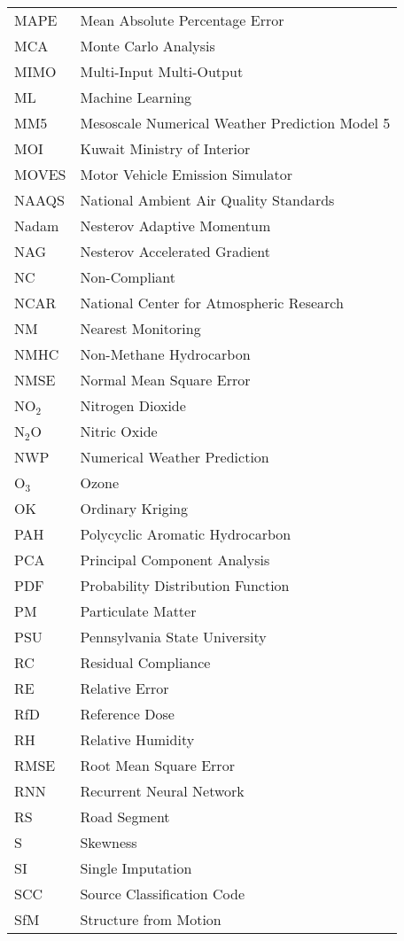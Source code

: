 \begin{longtable}{ll}
MAPE & Mean Absolute Percentage Error \\
MCA & Monte Carlo Analysis \\
MIMO & Multi-Input Multi-Output \\
ML & Machine Learning \\
MM5 & Mesoscale Numerical Weather Prediction Model 5 \\
MOI & Kuwait Ministry of Interior \\
MOVES & Motor Vehicle Emission Simulator \\
NAAQS & National Ambient Air Quality Standards \\
Nadam & Nesterov Adaptive Momentum \\
NAG & Nesterov Accelerated Gradient \\
NC & Non-Compliant \\
NCAR & National Center for Atmospheric Research \\
NM & Nearest Monitoring \\
NMHC & Non-Methane Hydrocarbon \\
NMSE & Normal Mean Square Error \\
NO$_{2}$ & Nitrogen Dioxide \\
N$_{2}$O & Nitric Oxide \\
NWP & Numerical Weather Prediction \\
O$_{3}$ & Ozone \\
OK & Ordinary Kriging \\
PAH & Polycyclic Aromatic Hydrocarbon \\
PCA & Principal Component Analysis \\
PDF & Probability Distribution Function \\
PM & Particulate Matter \\
PSU & Pennsylvania State University \\
RC & Residual Compliance \\
RE & Relative Error \\
RfD & Reference Dose \\
RH & Relative Humidity \\
RMSE & Root Mean Square Error \\
RNN & Recurrent Neural Network \\
RS & Road Segment \\
S & Skewness \\
SI & Single Imputation \\
SCC & Source Classification Code \\
SfM & Structure from Motion \\

\end{longtable}
